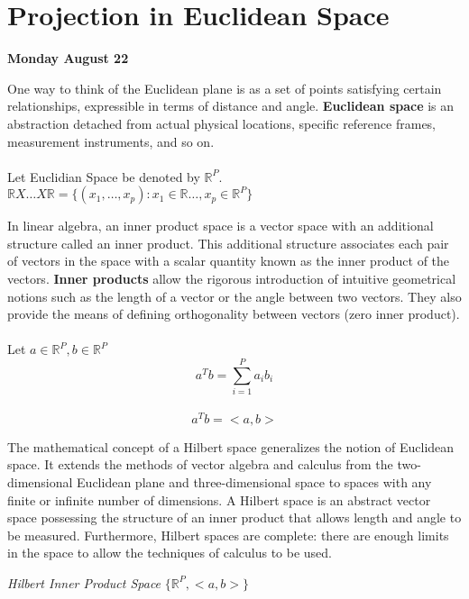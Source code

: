 \documentclass[11pt,fleqn]{book} %
\begin{document}
\section{Projection in Euclidean Space}

\textbf{Monday August 22}

\begin{definition}
	One way to think of the Euclidean plane is as a set of points satisfying certain relationships, expressible in terms of distance and angle. \textbf{Euclidean space} is an abstraction detached from actual physical locations, specific reference frames, measurement instruments, and so on.\\
\\
	Let Euclidian Space be denoted by $\mathbb{R}^P$. \\ 

	$\mathbb{R}X \dots X\mathbb{R} = \{(x_1, \dots, x_p): x_1 \in \mathbb{R} \dots, x_p \in \mathbb{R}^P\} $
\end{definition}


\begin{definition}
In linear algebra, an inner product space is a vector space with an additional structure called an inner product. This additional structure associates each pair of vectors in the space with a scalar quantity known as the inner product of the vectors. \textbf{Inner products} allow the rigorous introduction of intuitive geometrical notions such as the length of a vector or the angle between two vectors. They also provide the means of defining orthogonality between vectors (zero inner product).\\
\\
	Let $a \in \mathbb{R}^P,  b \in \mathbb{R}^P$\\
$$ a^Tb = \displaystyle\sum^{P}_{i = 1} a_i b_i$$\\
$$a^Tb =<a,b>$$
\end{definition}

 \begin{definition}
 The mathematical concept of a Hilbert space generalizes the notion of Euclidean space. It extends the methods of vector algebra and calculus from the two-dimensional Euclidean plane and three-dimensional space to spaces with any finite or infinite number of dimensions. A Hilbert space is an abstract vector space possessing the structure of an inner product that allows length and angle to be measured. Furthermore, Hilbert spaces are complete: there are enough limits in the space to allow the techniques of calculus to be used.

 \textit{Hilbert Inner Product Space }$\{\mathbb{R}^P, <a, b>\} $ 

 	
 \end{definition}
\end{document}
